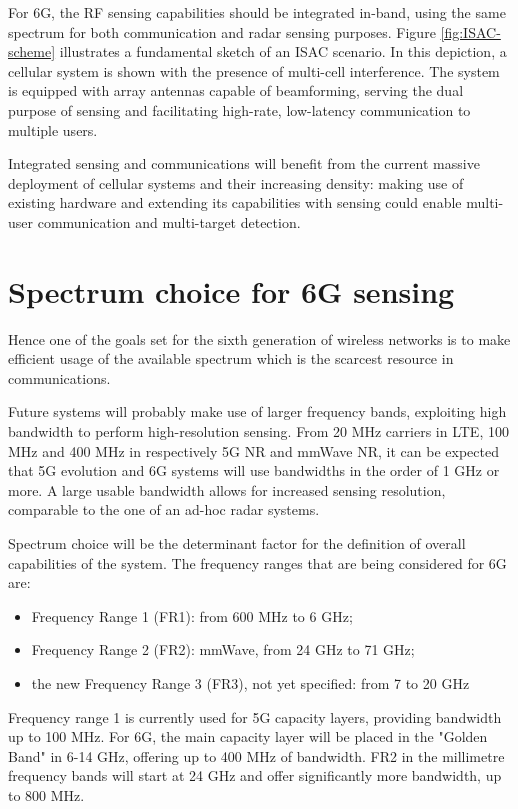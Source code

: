 For 6G, the RF sensing capabilities should be integrated in-band, using the same spectrum for both communication and radar sensing purposes. Figure \ref{fig:ISAC-scheme} illustrates a fundamental sketch of an ISAC scenario. In this depiction, a cellular system is shown with the presence of multi-cell interference. The system is equipped with array antennas capable of beamforming, serving the dual purpose of sensing and facilitating high-rate, low-latency communication to multiple users.

Integrated sensing and communications will benefit from the current massive deployment of cellular systems and their increasing density: making use of existing hardware and extending its capabilities with sensing could enable multi-user communication and multi-target detection.

\section{Spectrum choice for 6G sensing}

 Hence one of the goals set for the sixth generation of wireless networks is to make efficient usage of the available spectrum which is the scarcest resource in communications.

Future systems will probably make use of larger frequency bands, exploiting high bandwidth to perform high-resolution sensing. From 20 MHz carriers in LTE, 100 MHz and 400 MHz in respectively 5G NR and mmWave NR, it can be expected that 5G evolution and 6G systems will use bandwidths in the order of 1 GHz or more. A large usable bandwidth allows for increased sensing resolution, comparable to the one of an ad-hoc radar systems.

Spectrum choice will be the determinant factor for the definition of overall capabilities of the system. The frequency ranges that are being considered for 6G \cite{Hexa} are:

\begin{itemize}
	\item Frequency Range 1 (FR1): from 600 MHz to 6 GHz;
	\item Frequency Range 2 (FR2): mmWave, from 24 GHz to 71 GHz;
	\item the new Frequency Range 3 (FR3), not yet specified: from 7 to 20 GHz
\end{itemize}

Frequency range 1 is currently used for 5G capacity layers, providing bandwidth up to 100 MHz. For 6G, the main capacity layer will be placed in the "Golden Band" in 6-14 GHz, offering up to 400 MHz of bandwidth. FR2 in the millimetre frequency bands will start at 24 GHz and offer significantly more bandwidth, up to 800 MHz.

